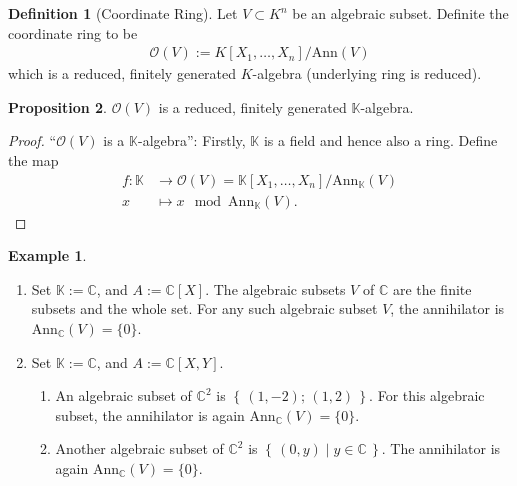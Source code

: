 \documentclass[a4paper]{book}
\theoremstyle{definition}
\newtheorem{definition}{Definition}[]
\newtheorem{example}{Example}[definition]
\newtheorem{proposition}[definition]{Proposition}
\newcommand{\set}[1]{\left\{\, #1 \,\right\}}
\newcommand{\makeset}[2]{\left\{\, #1 \mid #2 \,\right\}}
\begin{document}
\begin{defbox}
    \begin{definition}[Coordinate Ring]
        Let \(V \subset K^n\) be an algebraic subset. Definite the coordinate ring to be \begin{align*}
            \mathcal{O}(V) := K[X_1, \ldots, X_n] / \text{Ann}(V)
        \end{align*}
        which is a reduced, finitely generated \(K\)-algebra (underlying ring is reduced).
    \end{definition}
\end{defbox}
\begin{thmbox}
    \begin{proposition}
        \(\mathcal{O}(V)\) is a reduced, finitely generated \(\mathbb{K}\)-algebra.
    \end{proposition}
\end{thmbox}
\begin{proof}
    ``\(\mathcal{O}(V)\) is a \(\mathbb{K}\)-algebra'': Firstly, \(\mathbb{K}\) is a field and hence also a ring. Define the map
    \begin{align*}
        f: \mathbb{K} &\longrightarrow \mathcal{O}(V) = \mathbb{K}[X_1, \ldots, X_n] / \text{Ann}_\mathbb{K}(V) \\
        x &\longmapsto x \mod{\text{Ann}_\mathbb{K}(V)} \text{.}
    \end{align*}
\end{proof}
\begin{example}
    \begin{enumerate}
        \item Set \(\mathbb{K} := \mathbb{C}\), and \(A := \mathbb{C}[X]\). The algebraic subsets \(V\) of \(\mathbb{C}\) are the finite subsets and the whole set. For any such algebraic subset \(V\), the annihilator is \(\text{Ann}_\mathbb{C}(V) = \{0\}\).
        \item Set \(\mathbb{K} := \mathbb{C}\), and \(A := \mathbb{C}[X, Y]\).
        \begin{enumerate}
            \item An algebraic subset of \(\mathbb{C}^2\) is \(\set{(1, -2);\, (1, 2)}\). For this algebraic subset, the annihilator is again \(\text{Ann}_\mathbb{C}(V) = \{0\}\).
            \item Another algebraic subset of \(\mathbb{C}^2\) is \(\makeset{(0, y)}{y \in \mathbb{C}}\). The annihilator is again \(\text{Ann}_\mathbb{C}(V) = \{0\}\).
        \end{enumerate}
    \end{enumerate}
\end{example}
\end{document}
